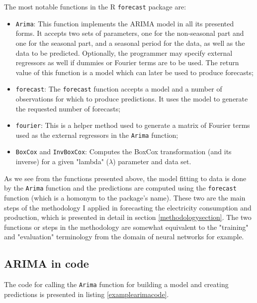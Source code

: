 \documentclass[12pt,a4paper,titlepage]{report}
\begin{document}
The most notable functions in the R \texttt{forecast} package are:
\begin{itemize}
    \item \texttt{Arima}: This function implements the ARIMA model in all its presented forms. It accepts two sets of parameters, one for the non-seasonal part and one for the seasonal part, and a seasonal period for the data, as well as the data to be predicted. Optionally, the programmer may specify external regressors as well if dummies or Fourier terms are to be used. The return value of this function is a model which can later be used to produce forecasts;
    \item \texttt{forecast}: The \texttt{forecast} function accepts a model and a number of observations for which to produce predictions. It uses the model to generate the requested number of forecasts;
    \item \texttt{fourier}: This is a helper method used to generate a matrix of Fourier terms used as the external regressors in the \texttt{Arima} function;
    \item \texttt{BoxCox} and \texttt{InvBoxCox}: Computes the BoxCox transformation (and its inverse) for a given "lambda" ($ \lambda $) parameter and data set.
\end{itemize}

As we see from the functions presented above, the model fitting to data is done by the \texttt{Arima} function and the predictions are computed using the \texttt{forecast} function (which is a homonym to the package's name). These two are the main steps of the methodology I applied in forecasting the electricity consumption and production, which is presented in detail in section \ref{methodologysection}. The two functions or steps in the methodology are somewhat equivalent to the "training" and "evaluation" terminology from the domain of neural networks for example.


\subsection{ARIMA in code}
The code for calling the \texttt{Arima} function for building a model and creating predictions is presented in listing \ref{examplearimacode}.
\end{document}
